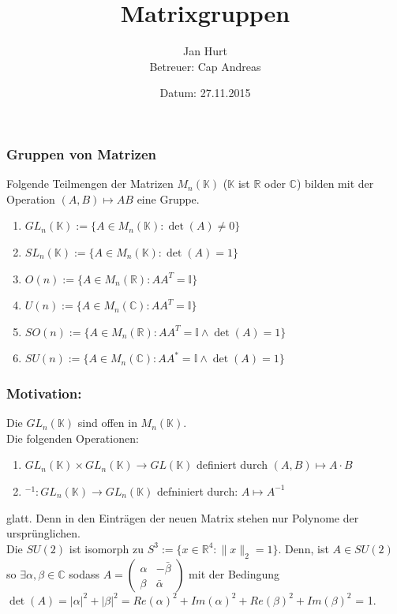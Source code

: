 \documentclass[11pt]{beamer}
\title{Matrixgruppen}
\author{Jan Hurt\\
		Betreuer: Cap Andreas}
\date{\small{Datum: 27.11.2015}}
\begin{document}
\begin{frame}
\titlepage
\end{frame}

\begin{frame}
	\frametitle{Gruppen von Matrizen}
	Folgende Teilmengen der Matrizen $M_n(\mathbb{K})$
	($\mathbb{K}$ ist $\mathbb{R}$ oder $\mathbb{C}$) bilden mit der Operation
	$(A,B) \mapsto AB$ eine Gruppe. \pause
	\begin{enumerate}[label = $(\roman*)$]
	\item $GL_n(\mathbb{K}) := \{A \in M_n(\mathbb{K}): \det(A) \neq 0 \}$ \\[0.5em] \pause 

	\item $SL_n(\mathbb{K}) := \{A \in M_n(\mathbb{K}): \det(A) = 1 \}$ \\[0.5em]

	\item $O(n) := \{A \in M_n(\mathbb{R}): AA^T = \mathbb{I} \}$ \\[0.5em]

	\item $U(n) := \{A \in M_n(\mathbb{C}): AA^T = \mathbb{I} \}$ \\[0.5em]

	\item $SO(n) := \{A \in M_n(\mathbb{R}): AA^T = \mathbb{I} \wedge \det(A) = 1  \}$ \\[0.5em]

	\item $SU(n) := \{A \in M_n(\mathbb{C}): AA^* = \mathbb{I} \wedge \det(A) = 1 \}$ \\[0.5em]
	\end{enumerate}
\end{frame}

\begin{frame}
	\frametitle{Motivation:}
	Die $GL_n(\mathbb{K})$ sind offen in $M_n(\mathbb K)$. \\ [1em] \pause 
	Die folgenden Operationen: 
	\begin{enumerate}[label = $(\roman*)$]
		\item $GL_n(\mathbb{K}) \times GL_n(\mathbb{K}) \to GL(\mathbb K)$ definiert durch $(A,B) \mapsto A\cdot B$ \pause
		
		\item $^{-1}:GL_n(\mathbb{K}) \rightarrow GL_n(\mathbb{K})$ defniniert durch: $A\mapsto A^{-1}$
	\end{enumerate}
	glatt. \pause 
	Denn in den Einträgen der neuen Matrix stehen nur Polynome der
	ursprünglichen. \\[1em] \pause 
	Die $SU(2)$ ist isomorph zu $S^3 :=\{ x \in \mathbb{R}^4: \|x\|_2 = 1\}$. \pause 
	Denn, ist $A \in SU(2)$ so
	$\exists \alpha, \beta \in \mathbb{C}$ sodass
	$A = \left( \begin{matrix} \alpha & -\bar{\beta} \\ \beta  & \bar{\alpha}\end{matrix} \right)$
	mit der Bedingung $\det(A) = |\alpha|^2 + |\beta|^2 =
	Re(\alpha)^2 + Im(\alpha)^2 + Re(\beta)^2 + Im(\beta)^2$ = 1. \\[1em]
\end{frame}
\end{document}

